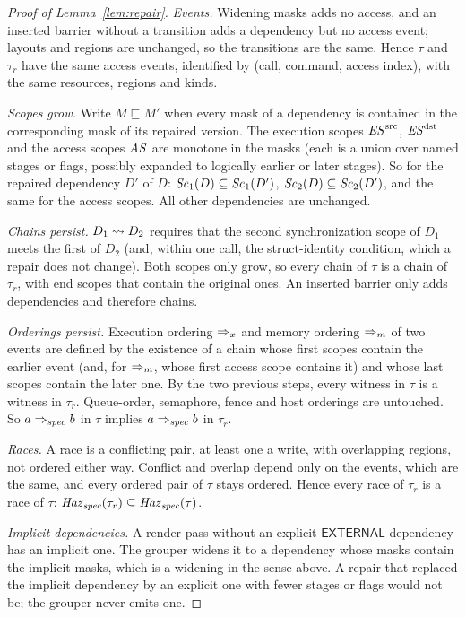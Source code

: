 \begin{proof}[Proof of Lemma~\ref{lem:repair}]
\emph{Events.} Widening masks adds no access, and an inserted barrier without a transition adds a dependency but no
access event; layouts and regions are unchanged, so the transitions are the same. Hence $\tau$ and $\tau_r$ have the
same access events, identified by (call, command, access index), with the same resources, regions and kinds.

\emph{Scopes grow.} Write $M \sqsubseteq M'$ when every mask of a dependency is contained in the corresponding mask of
its repaired version. The execution scopes $\mathit{ES}^{\mathrm{src}}$, $\mathit{ES}^{\mathrm{dst}}$ and the access scopes $\mathit{AS}$ are monotone in the masks
(each is a union over named stages or flags, possibly expanded to logically earlier or later stages). So for the
repaired dependency $D'$ of $D$: $\mathit{Sc}_{1}(D) \subseteq \mathit{Sc}_{1}(D')$, $\mathit{Sc}_{2}(D) \subseteq \mathit{Sc}_{2}(D')$, and the same for
the access scopes. All other dependencies are unchanged.

\emph{Chains persist.} $D_1 \rightsquigarrow D_2$ requires that the second synchronization scope of $D_1$ meets the first of
$D_2$ (and, within one call, the struct-identity condition, which a repair does not change). Both scopes only grow,
so every chain of $\tau$ is a chain of $\tau_r$, with end scopes that contain the original ones. An inserted barrier
only adds dependencies and therefore chains.

\emph{Orderings persist.} Execution ordering $\Rightarrow_{x}$ and memory ordering $\Rightarrow_{m}$ of two events are defined by the
existence of a chain whose first scopes contain the earlier event (and, for $\Rightarrow_{m}$, whose first access scope
contains it) and whose last scopes contain the later one. By the two previous steps, every witness in $\tau$ is a
witness in $\tau_r$. Queue-order, semaphore, fence and host orderings are untouched. So $a \Rightarrow_{\mathit{spec}} b$ in $\tau$ implies
$a \Rightarrow_{\mathit{spec}} b$ in $\tau_r$.

\emph{Races.} A race is a conflicting pair, at least one a write, with overlapping regions, not ordered either way.
Conflict and overlap depend only on the events, which are the same, and every ordered pair of $\tau$ stays ordered.
Hence every race of $\tau_r$ is a race of $\tau$: $\mathit{Haz}_{\mathit{spec}}(\tau_r) \subseteq \mathit{Haz}_{\mathit{spec}}(\tau)$.

\emph{Implicit dependencies.} A render pass without an explicit $\mathsf{EXTERNAL}$ dependency has an implicit one.
The grouper widens it to a dependency whose masks contain the implicit masks, which is a widening in the sense above.
A repair that replaced the implicit dependency by an explicit one with fewer stages or flags would not be; the
grouper never emits one.
\end{proof}

